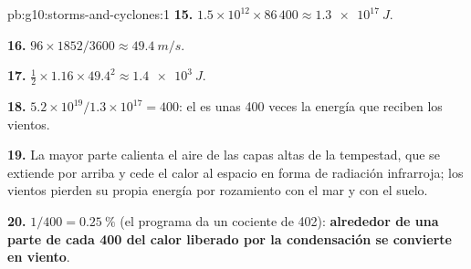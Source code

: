 \begin{solution}{pb:g10:storms-and-cyclones:1}
\textbf{15.} $1.5\times10^{12} \times 86\,400 \approx \qty{1.3e17}{J}$.

\textbf{16.} $96 \times 1852/3600 \approx \qty{49.4}{m/s}$.

\textbf{17.} $\frac12 \times 1.16 \times 49.4^2 \approx \qty{1.4e3}{J}$.

\textbf{18.} $5.2\times10^{19}/1.3\times10^{17} = 400$: el  es
unas 400 veces la energía que reciben los vientos.

\textbf{19.} La mayor parte calienta el aire de las capas altas de la
tempestad, que se extiende por arriba y cede el calor al espacio en forma de
radiación infrarroja; los vientos pierden su propia energía por rozamiento
con el mar y con el suelo.

\textbf{20.} $1/400 = \qty{0.25}{\percent}$ (el programa da un cociente de
402): \textbf{alrededor de una parte de cada 400 del calor liberado por la
condensación se convierte en viento}.
\end{solution}
